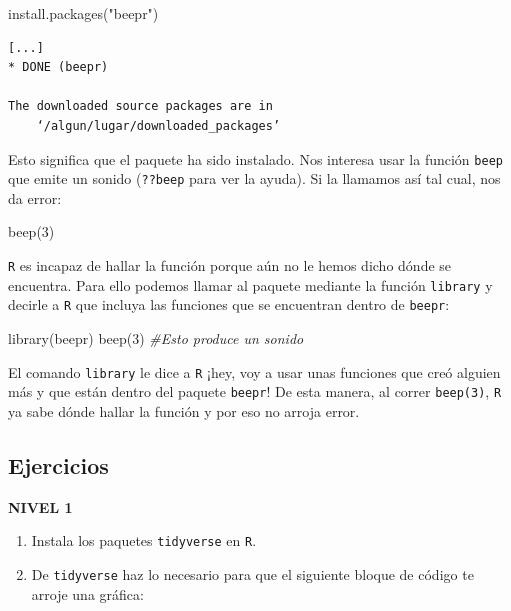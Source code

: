 \documentclass[
]{book}
\newenvironment{Shaded}{\begin{snugshade}}{\end{snugshade}}
\newcommand{\CommentTok}[1]{\textcolor[rgb]{0.56,0.35,0.01}{\textit{#1}}}
\newcommand{\DecValTok}[1]{\textcolor[rgb]{0.00,0.00,0.81}{#1}}
\newcommand{\FunctionTok}[1]{\textcolor[rgb]{0.00,0.00,0.00}{#1}}
\newcommand{\NormalTok}[1]{#1}
\newcommand{\StringTok}[1]{\textcolor[rgb]{0.31,0.60,0.02}{#1}}
\providecommand{\tightlist}{%
  \setlength{\itemsep}{0pt}\setlength{\parskip}{0pt}}
\begin{document}
\begin{Shaded}
\begin{Highlighting}[]
\FunctionTok{install.packages}\NormalTok{(}\StringTok{"beepr"}\NormalTok{)}
\end{Highlighting}
\end{Shaded}

\begin{verbatim}
[...]
* DONE (beepr)

The downloaded source packages are in
    ‘/algun/lugar/downloaded_packages’
\end{verbatim}

Esto significa que el paquete ha sido instalado. Nos interesa usar la función \texttt{beep} que emite un sonido (\texttt{??beep} para ver la ayuda). Si la llamamos así tal cual, nos da error:

\begin{Shaded}
\begin{Highlighting}[]
\FunctionTok{beep}\NormalTok{(}\DecValTok{3}\NormalTok{)}
\end{Highlighting}
\end{Shaded}

\texttt{R} es incapaz de hallar la función porque aún no le hemos dicho dónde se encuentra. Para ello podemos llamar al paquete mediante la función \texttt{library} y decirle a \texttt{R} que incluya las funciones que se encuentran dentro de \texttt{beepr}:

\begin{Shaded}
\begin{Highlighting}[]
\FunctionTok{library}\NormalTok{(beepr)}
\FunctionTok{beep}\NormalTok{(}\DecValTok{3}\NormalTok{) }\CommentTok{\#Esto produce un sonido}
\end{Highlighting}
\end{Shaded}

El comando \texttt{library} le dice a \texttt{R} ¡hey, voy a usar unas funciones que creó alguien más y que están dentro del paquete \texttt{beepr}! De esta manera, al correr \texttt{beep(3)}, \texttt{R} ya sabe dónde hallar la función y por eso no arroja error.

\hypertarget{ejercicios-3}{%
\subsection{Ejercicios}\label{ejercicios-3}}

\textbf{NIVEL 1}

\begin{enumerate}
\def\labelenumi{\arabic{enumi}.}
\tightlist
\item
  Instala los paquetes \texttt{tidyverse} en \texttt{R}.
\item
  De \texttt{tidyverse} haz lo necesario para que el siguiente bloque de código te arroje una gráfica:
\end{enumerate}
\end{document}
